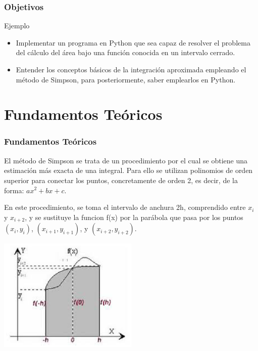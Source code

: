 \documentclass{beamer}
\begin{document}
\begin{frame}

\frametitle{Objetivos }

\begin{block}{Ejemplo}
  \begin{itemize}
  \item
   Implementar un programa en Python que sea capaz de resolver el problema del cálculo del área bajo una función conocida en un 
   intervalo cerrado.
  \pause
  \item
   Entender los conceptos básicos de la integración aproximada empleando el método de Simpson, para posteriormente, saber emplearlos
   en Python.

  \end{itemize}
\end{block}

\end{frame}

\section{Fundamentos Teóricos}

\begin{frame}
\frametitle{Fundamentos Teóricos}
	El método de Simpson se trata de un procedimiento por el cual se obtiene una estimación más exacta de una integral. Para ello se 
utilizan polinomios de orden superior para conectar los puntos, concretamente de orden 2, es decir, de la forma: $ ax^2 + bx + c $.

	En este procedimiento, se toma el intervalo de anchura 2h, comprendido entre $x_{i}$ y $ x_{i+2} $, y se sustituye la funcion f(x) por la parábola que pasa por los puntos $ (x_{i},y_{i}) $, $ (x_{i+1},y_{i+1}) $, y $ (x_{i+2},y_{i+2}) $.

\begin{center}
\includegraphics[width=0.5\textwidth]{img/ima1.eps}
\end{center}	
	

\end{frame}
\end{document}
